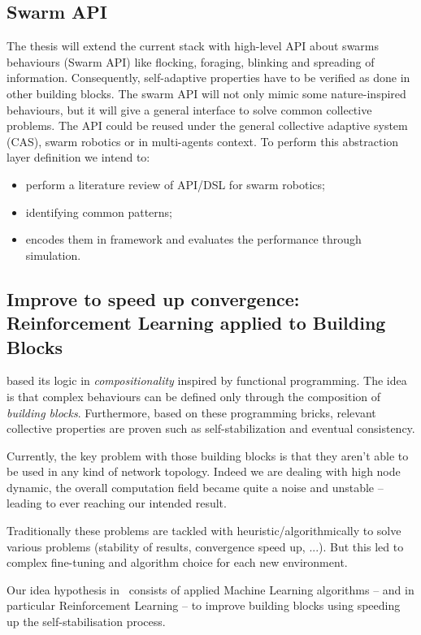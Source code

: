 \documentclass[11pt]{article}
\begin{document}
\subsection{Swarm API}
The thesis will extend the current \ac{} stack with high-level API about swarms behaviours (Swarm API) like flocking, foraging, blinking and spreading of information.  Consequently, self-adaptive properties have to be verified as done in other building blocks.  The swarm API will not only mimic some nature-inspired behaviours, but it will give a general interface to solve common collective problems. The API could be reused under the general collective adaptive system (CAS), swarm robotics or in multi-agents context.
To perform this abstraction layer definition we intend to:
\begin{itemize}
	\item perform a literature review of API/DSL for swarm robotics;
	\item identifying common patterns;
	\item encodes them in \ac{} framework and evaluates the performance through simulation.
\end{itemize}
\subsection{Improve to speed up convergence: Reinforcement Learning applied to Building Blocks}
\ac{} based its logic in \textit{compositionality} inspired by functional programming. The idea is that complex behaviours can be defined only through the composition of \emph{building blocks}. Furthermore, based on these programming bricks, relevant collective properties are proven such as self-stabilization and eventual consistency. 

Currently, the key problem with those building blocks is that they aren't able to be used in any kind of network topology. Indeed we are dealing with high node dynamic, the overall computation field became quite a noise and unstable -- leading to ever reaching our intended result.

Traditionally these problems are tackled with heuristic/algorithmically to solve various problems (stability of results, convergence speed up, ...). But this led to complex fine-tuning and algorithm choice for each new environment.

Our idea hypothesis in~\cite{research} consists of applied Machine Learning algorithms -- and in particular Reinforcement Learning -- to improve building blocks using speeding up the self-stabilisation process.
\end{document}
